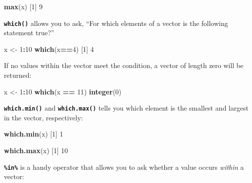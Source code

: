 \documentclass[
]{book}
\newenvironment{Shaded}{\begin{snugshade}}{\end{snugshade}}
\newcommand{\DecValTok}[1]{\textcolor[rgb]{0.00,0.00,0.81}{#1}}
\newcommand{\FunctionTok}[1]{\textcolor[rgb]{0.13,0.29,0.53}{\textbf{#1}}}
\newcommand{\NormalTok}[1]{#1}
\newcommand{\OtherTok}[1]{\textcolor[rgb]{0.56,0.35,0.01}{#1}}
\newcommand{\SpecialCharTok}[1]{\textcolor[rgb]{0.81,0.36,0.00}{\textbf{#1}}}
\begin{document}
\begin{Shaded}
\begin{Highlighting}[]
\FunctionTok{max}\NormalTok{(x)}
\NormalTok{[}\DecValTok{1}\NormalTok{] }\DecValTok{9}
\end{Highlighting}
\end{Shaded}

\textbf{\texttt{which()}} allows you to ask, ``For which elements of a vector is the following statement true?''

\begin{Shaded}
\begin{Highlighting}[]
\NormalTok{x }\OtherTok{\textless{}{-}} \DecValTok{1}\SpecialCharTok{:}\DecValTok{10}
\FunctionTok{which}\NormalTok{(x}\SpecialCharTok{==}\DecValTok{4}\NormalTok{)}
\NormalTok{[}\DecValTok{1}\NormalTok{] }\DecValTok{4}
\end{Highlighting}
\end{Shaded}

If no values within the vector meet the condition, a vector of length zero will be returned:

\begin{Shaded}
\begin{Highlighting}[]
\NormalTok{x }\OtherTok{\textless{}{-}} \DecValTok{1}\SpecialCharTok{:}\DecValTok{10}
\FunctionTok{which}\NormalTok{(x }\SpecialCharTok{==} \DecValTok{11}\NormalTok{)}
\FunctionTok{integer}\NormalTok{(}\DecValTok{0}\NormalTok{)}
\end{Highlighting}
\end{Shaded}

\textbf{\texttt{which.min()}} and \textbf{\texttt{which.max()}} tells you which element is the smallest and largest in the vector, respectively:

\begin{Shaded}
\begin{Highlighting}[]
\FunctionTok{which.min}\NormalTok{(x)}
\NormalTok{[}\DecValTok{1}\NormalTok{] }\DecValTok{1}
\end{Highlighting}
\end{Shaded}

\begin{Shaded}
\begin{Highlighting}[]
\FunctionTok{which.max}\NormalTok{(x)}
\NormalTok{[}\DecValTok{1}\NormalTok{] }\DecValTok{10}
\end{Highlighting}
\end{Shaded}

\textbf{\texttt{\%in\%}} is a handy operator that allows you to ask whether a value occurs \emph{within} a vector:
\end{document}
